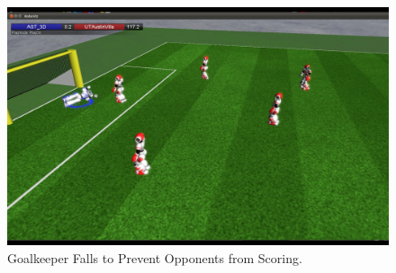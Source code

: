 \begin{figure}[t!]
	\includegraphics[trim = 5cm 10cm 30cm 5cm, clip,scale=0.25]{Chapter3/figures/GoalieFall4.png}
	\caption{Goalkeeper Falls to Prevent Opponents from Scoring.}
  \label{fig:GoalkeeperFall}
\end{figure}

